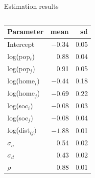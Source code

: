 \documentclass{beamer}
\begin{document}
\begin{frame}{Estimation results}
		\begin{columns}
		\begin{column}{0.5\textwidth}
			\begin{center}
				\begin{small}
			  \begin{tabular}{lrr}
				\toprule
				Parameter & mean & sd \\ 
				\midrule
				Intercept      & $-0.34$ & 0.05 \\ 
				log(pop$_i$)   & 0.88 & 0.04  \\ 
				log(pop$_j$)   & 0.91 & 0.05  \\ 
				log(home$_i$)  & $-0.44$ & 0.18 \\ 
				log(home$_j$)  & $-0.69$ & 0.22  \\ 
				log(soc$_i$)   & $-0.08$ & 0.03  \\
				log(soc$_j$)   & $-0.08$ & 0.04 \\ 
				log(dist$_{ij})$ & $-1.88$ & 0.01  \\ 
				$\sigma_o$    & 0.54 & 0.02  \\ 
				$\sigma_d$    & 0.43 & 0.02  \\ 
				$\rho$        & 0.88 & 0.01  \\ 
				\bottomrule
			\end{tabular}
		\end{small}
		\end{center}
		\end{column}
		\begin{column}{0.5\textwidth} 


\end{column}
\end{columns}
\end{frame}
\end{document}
